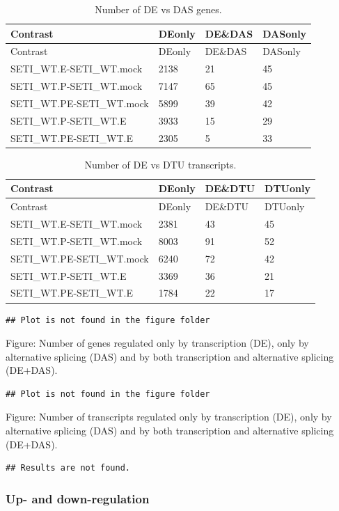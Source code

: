 \documentclass[]{article}
\begin{document}
\begin{longtable}[]{@{}llll@{}}
\caption{Number of DE vs DAS genes.}\tabularnewline
\toprule
Contrast & DEonly & DE\&DAS & DASonly\tabularnewline
\midrule
\endfirsthead
\toprule
Contrast & DEonly & DE\&DAS & DASonly\tabularnewline
\midrule
\endhead
SETI\_WT.E-SETI\_WT.mock & 2138 & 21 & 45\tabularnewline
SETI\_WT.P-SETI\_WT.mock & 7147 & 65 & 45\tabularnewline
SETI\_WT.PE-SETI\_WT.mock & 5899 & 39 & 42\tabularnewline
SETI\_WT.P-SETI\_WT.E & 3933 & 15 & 29\tabularnewline
SETI\_WT.PE-SETI\_WT.E & 2305 & 5 & 33\tabularnewline
\bottomrule
\end{longtable}

\begin{longtable}[]{@{}llll@{}}
\caption{Number of DE vs DTU transcripts.}\tabularnewline
\toprule
Contrast & DEonly & DE\&DTU & DTUonly\tabularnewline
\midrule
\endfirsthead
\toprule
Contrast & DEonly & DE\&DTU & DTUonly\tabularnewline
\midrule
\endhead
SETI\_WT.E-SETI\_WT.mock & 2381 & 43 & 45\tabularnewline
SETI\_WT.P-SETI\_WT.mock & 8003 & 91 & 52\tabularnewline
SETI\_WT.PE-SETI\_WT.mock & 6240 & 72 & 42\tabularnewline
SETI\_WT.P-SETI\_WT.E & 3369 & 36 & 21\tabularnewline
SETI\_WT.PE-SETI\_WT.E & 1784 & 22 & 17\tabularnewline
\bottomrule
\end{longtable}

\begin{verbatim}
## Plot is not found in the figure folder
\end{verbatim}

Figure: Number of genes regulated only by transcription (DE), only by
alternative splicing (DAS) and by both transcription and alternative
splicing (DE+DAS).

\begin{verbatim}
## Plot is not found in the figure folder
\end{verbatim}

Figure: Number of transcripts regulated only by transcription (DE), only
by alternative splicing (DAS) and by both transcription and alternative
splicing (DE+DAS).

\begin{verbatim}
## Results are not found.
\end{verbatim}

\subsubsection{Up- and down-regulation}\label{up--and-down-regulation}
\end{document}
